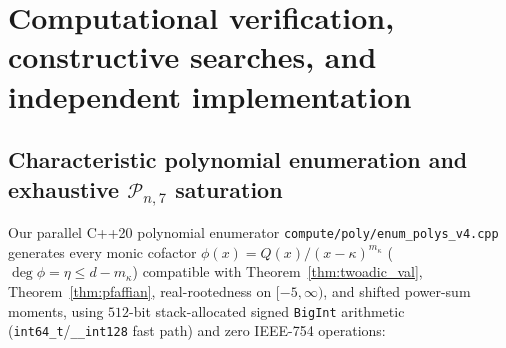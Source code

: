 \documentclass[11pt,reqno]{amsart}
\theoremstyle{definition}
\theoremstyle{remark}
\numberwithin{equation}{section}
\numberwithin{table}{section}
\begin{document}
\section{Computational verification, constructive searches, and independent implementation}\label{sec:compute}

\subsection{Characteristic polynomial enumeration and exhaustive \texorpdfstring{$\mathcal{P}_{n,7}$}{P_(n,7)} saturation}
Our parallel C++20 polynomial enumerator \nolinkurl{compute/poly/enum_polys_v4.cpp} generates every monic cofactor $\phi(x) = Q(x)/(x - \kappa)^{m_\kappa}$ ($\deg\phi = \eta \le d - m_\kappa$) compatible with Theorem~\ref{thm:twoadic_val}, Theorem~\ref{thm:pfaffian}, real-rootedness on $[-5, \infty)$, and shifted power-sum moments, using $512$-bit stack-allocated signed \texttt{BigInt} arithmetic (\texttt{int64\_t}/\texttt{\_\_int128} fast path) and zero IEEE-754 operations:
\end{document}
